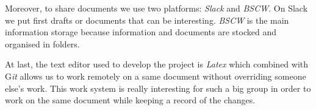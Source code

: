 Moreover, to share documents we use two platforms: \textit{Slack} and \textit{BSCW}. On Slack we put first drafts or documents that can be interesting. \textit{BSCW} is the main information storage because information and documents are stocked and organised in folders. 
\newline

At last, the text editor used to develop the project is \textit{Latex} which combined with G\textit{it} allows us to work remotely on a same document without overriding someone else's work. This work system is really interesting for such a big group in order to work on the same document while keeping a record of the changes.